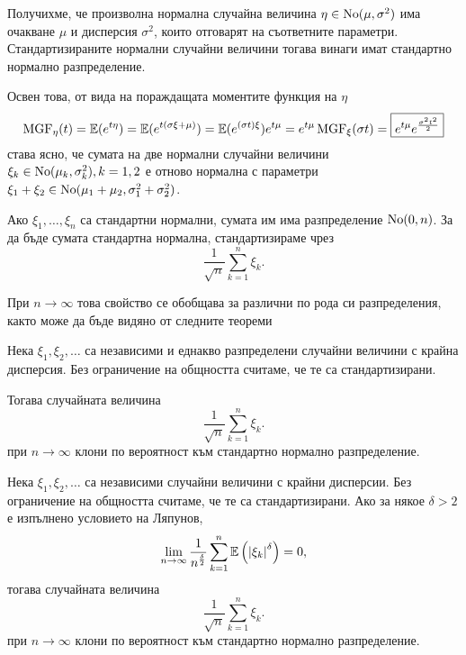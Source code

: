 \documentclass[numbers=endperiod, DIV=15, bibliography=totocnumbered]{scrartcl}
\begin{document}
Получихме, че произволна нормална случайна величина $\eta \in \operatorname{No}(\mu, \sigma^2)$ има очакване $\mu$ и дисперсия $\sigma^2$, които отговарят на съответните параметри. Стандартизираните нормални случайни величини тогава винаги имат стандартно нормално разпределение.

Освен това, от вида на пораждащата моментите функция на $\eta$
\begin{displaymath}
  \operatorname{MGF}_\eta(t)
  =
  \mathbb{E}(e^{t\eta})
  =
  \mathbb{E}(e^{t(\sigma\xi + \mu)})
  =
  \mathbb{E}(e^{(\sigma t) \xi}) e^{t\mu}
  =
  e^{t\mu} \operatorname{MGF}_\xi(\sigma t)
  =
  \boxed{e^{t\mu} e^{\frac {\sigma^2 t^2} 2}}
\end{displaymath}
става ясно, че сумата на две нормални случайни величини $\xi_k \in \operatorname{No}(\mu_k, \sigma_k^2), k = 1, 2$ е отново нормална с параметри $\xi_1 + \xi_2 \in \operatorname{No}(\mu_1 + \mu_2, \sigma_1^2 + \sigma_2^2)$.

Ако $\xi_1, \ldots, \xi_n$ са стандартни нормални, сумата им има разпределение $\operatorname{No}(0, n)$. За да бъде сумата стандартна нормална, стандартизираме чрез
\begin{displaymath}
  \frac 1 {\sqrt n} \sum_{k=1}^n \xi_k.
\end{displaymath}

При $n \to \infty$ това свойство се обобщава за различни по рода си разпределения, както може да бъде видяно от следните теореми

\begin{theorem}
  Нека $\xi_1, \xi_2, \ldots$ са независими и еднакво разпределени случайни величини с крайна дисперсия. Без ограничение на общността считаме, че те са стандартизирани.

  Тогава случайната величина
  \begin{displaymath}
    \frac 1 {\sqrt n} \sum_{k=1}^n \xi_k.
  \end{displaymath}
  при $n \to \infty$ клони по вероятност към стандартно нормално разпределение.
\end{theorem}

\begin{theorem}
  Нека $\xi_1, \xi_2, \ldots$ са независими случайни величини с крайни дисперсии. Без ограничение на общността считаме, че те са стандартизирани.
  Ако за някое $\delta > 2$ е изпълнено условието на Ляпунов,
  \begin{displaymath}
    \lim_{n \to \infty} \frac 1 {n^{\frac \delta 2}} \sum_{k=1}^n \mathbb{E} \left( {\left\vert \xi_k \right\vert}^\delta \right) = 0,
  \end{displaymath}
  тогава случайната величина
  \begin{displaymath}
    \frac 1 {\sqrt n} \sum_{k=1}^n \xi_k.
  \end{displaymath}
  при $n \to \infty$ клони по вероятност към стандартно нормално разпределение.
\end{theorem}
\end{document}
